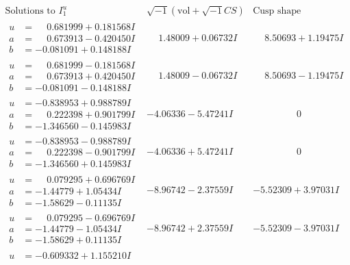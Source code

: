 \documentclass[1p]{elsarticle_modified}
\theoremstyle{definition}
\newcommand{\I}{\sqrt{-1}}
\begin{document}
$$\begin{array}{c|c|c}
\text{Solutions to }I^u_{1}& \I (\text{vol} + \sqrt{-1}CS) & \text{Cusp shape}\\
 \hline 
\begin{aligned}
u &= \phantom{-}0.681999 + 0.181568 I \\
a &= \phantom{-}0.673913 - 0.420450 I \\
b &= -0.081091 + 0.148188 I\end{aligned}
 & \phantom{-}1.48009 + 0.06732 I & \phantom{-}8.50693 + 1.19475 I \\ \hline\begin{aligned}
u &= \phantom{-}0.681999 - 0.181568 I \\
a &= \phantom{-}0.673913 + 0.420450 I \\
b &= -0.081091 - 0.148188 I\end{aligned}
 & \phantom{-}1.48009 - 0.06732 I & \phantom{-}8.50693 - 1.19475 I \\ \hline\begin{aligned}
u &= -0.838953 + 0.988789 I \\
a &= \phantom{-}0.222398 + 0.901799 I \\
b &= -1.346560 - 0.145983 I\end{aligned}
 & -4.06336 - 5.47241 I & \phantom{-0.000000 } 0 \\ \hline\begin{aligned}
u &= -0.838953 - 0.988789 I \\
a &= \phantom{-}0.222398 - 0.901799 I \\
b &= -1.346560 + 0.145983 I\end{aligned}
 & -4.06336 + 5.47241 I & \phantom{-0.000000 } 0 \\ \hline\begin{aligned}
u &= \phantom{-}0.079295 + 0.696769 I \\
a &= -1.44779 + 1.05434 I \\
b &= -1.58629 - 0.11135 I\end{aligned}
 & -8.96742 - 2.37559 I & -5.52309 + 3.97031 I \\ \hline\begin{aligned}
u &= \phantom{-}0.079295 - 0.696769 I \\
a &= -1.44779 - 1.05434 I \\
b &= -1.58629 + 0.11135 I\end{aligned}
 & -8.96742 + 2.37559 I & -5.52309 - 3.97031 I \\ \hline\begin{aligned}
u &= -0.609332 + 1.155210 I \\

\end{aligned}
\end{array}$$
\end{document}
